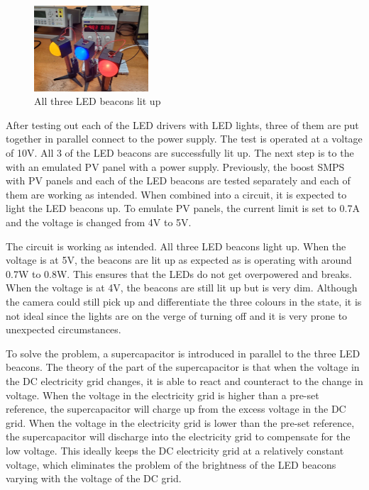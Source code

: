 \begin{figure}
    \includegraphics[width=0.38\textwidth]{images/all-leds.jpg}
    \caption{All three LED beacons lit up}
\end{figure}

After testing out each of the LED drivers with LED lights, three of them are put together in parallel connect to the power supply. The test is operated at a voltage of 10V. All 3 of the LED beacons are successfully lit up. The next step is to the with an emulated PV panel with a power supply. Previously, the boost SMPS with PV panels and each of the LED beacons are tested separately and each of them are working as intended. When combined into a circuit, it is expected to light the LED beacons up. To emulate PV panels, the current limit is set to 0.7A and the voltage is changed from 4V to 5V.

The circuit is working as intended. All three LED beacons light up. When the voltage is at 5V, the beacons are lit up as expected as is operating with around 0.7W to 0.8W. This ensures that the LEDs do not get overpowered and breaks. When the voltage is at 4V, the beacons are still lit up but is very dim. Although the camera could still pick up and differentiate the three colours in the state, it is not ideal since the lights are on the verge of turning off and it is very prone to unexpected circumstances.

To solve the problem, a supercapacitor is introduced in parallel to the three LED beacons. The theory of the part of the supercapacitor is that when the voltage in the DC electricity grid changes, it is able to react and counteract to the change in voltage. When the voltage in the electricity grid is higher than a pre-set reference, the supercapacitor will charge up from the excess voltage in the DC grid. When the voltage in the electricity grid is lower than the pre-set reference, the supercapacitor will discharge into the electricity grid to compensate for the low voltage. This ideally keeps the DC electricity grid at a relatively constant voltage, which eliminates the problem of the brightness of the LED beacons varying with the voltage of the DC grid.

